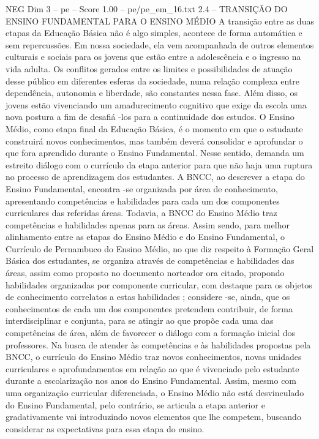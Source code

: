 \begin{textsample}{NEG Dim 3 – pe – Score 1.00 – pe/pe\_em\_16.txt}  \label{ex:f3_neg_019}
2.4 – TRANSIÇÃO DO ENSINO FUNDAMENTAL PARA O ENSINO MÉDIO A transição entre as duas etapas da Educação Básica não é algo simples, acontece de forma automática e sem repercussões.
Em nossa sociedade, ela vem acompanhada de outros elementos culturais e sociais para os jovens que estão entre a adolescência e o ingresso na vida adulta.
Os conflitos gerados entre os limites e possibilidades de atuação desse público em diferentes esferas da sociedade, numa relação complexa entre dependência, autonomia e liberdade, são constantes nessa fase.
Além disso, os jovens estão vivenciando um amadurecimento cognitivo que exige da escola uma nova postura a fim de desafiá -los para a continuidade dos estudos.
O Ensino Médio, como etapa final da Educação Básica, é o momento em que o estudante construirá novos conhecimentos, mas também deverá consolidar e aprofundar o que fora aprendido durante o Ensino Fundamental.
Nesse sentido, demanda um estreito diálogo com o currículo da etapa anterior para que não haja uma ruptura no processo de aprendizagem dos estudantes.
A BNCC, ao descrever a etapa do Ensino Fundamental, encontra -se organizada por área de conhecimento, apresentando competências e habilidades para cada um dos componentes curriculares das referidas áreas.
Todavia, a BNCC do Ensino Médio traz competências e habilidades apenas para as áreas.
Assim sendo, para melhor alinhamento entre as etapas do Ensino Médio e do Ensino Fundamental, o Currículo de Pernambuco do Ensino Médio, no que diz respeito à Formação Geral Básica dos estudantes, se organiza através de competências e habilidades das áreas, assim como proposto no documento norteador ora citado, propondo habilidades organizadas por componente curricular, com destaque para os objetos de conhecimento correlatos a estas habilidades ; considere -se, ainda, que os conhecimentos de cada um dos componentes pretendem contribuir, de forma interdisciplinar e conjunta, para se atingir ao que propõe cada uma das competências de área, além de favorecer o diálogo com a formação inicial dos professores.
Na busca de atender às competências e às habilidades propostas pela BNCC, o currículo do Ensino Médio traz novos conhecimentos, novas unidades curriculares e aprofundamentos em relação ao que é vivenciado pelo estudante durante a escolarização nos anos do Ensino Fundamental.
Assim, mesmo com uma organização curricular diferenciada, o Ensino Médio não está desvinculado do Ensino Fundamental, pelo contrário, se articula a etapa anterior e gradativamente vai introduzindo novos elementos que lhe competem, buscando considerar as expectativas para essa etapa do ensino.

\end{textsample}
